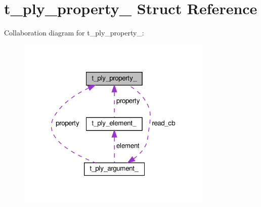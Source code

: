 \hypertarget{structt__ply__property__}{}\section{t\+\_\+ply\+\_\+property\+\_\+ Struct Reference}
\label{structt__ply__property__}


Collaboration diagram for t\+\_\+ply\+\_\+property\+\_\+\+:\nopagebreak
\begin{figure}[H]
\begin{center}
\leavevmode
\includegraphics[width=265pt]{structt__ply__property____coll__graph}
\end{center}
\end{figure}
